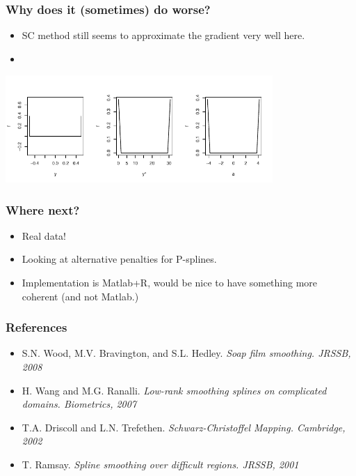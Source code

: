 \documentclass[ignorenonframetext]{beamer} %
\newcommand{\bc}{\begin{center}}
\newcommand{\ec}{\end{center}}
\newcommand{\bi}{\begin{itemize}}
\newcommand{\ei}{\end{itemize}}
\begin{document}
\begin{frame}
	\frametitle{Why does it (sometimes) do worse?}
       \bi
         \item SC method still seems to approximate the gradient very well here.
         \item 
       \ei
       \bc
          \includegraphics[width=4in]{figs/altcentrelinelineplots}\\
       \ec

\end{frame}

\begin{frame}
	\frametitle{Where next?}
       \bi
         \item Real data! 
         \item Looking at alternative penalties for P-splines.
         \item Implementation is Matlab+R, would be nice to have something more coherent (and not Matlab.)
        \ei
\end{frame}


\begin{frame}
	\frametitle{References}
       \bi
         \item S.N. Wood, M.V. Bravington, and S.L. Hedley. \emph{Soap film smoothing. JRSSB, 2008}
         \item H. Wang and M.G. Ranalli. \emph{Low-rank smoothing splines on complicated domains. Biometrics, 2007}
         \item T.A. Driscoll and L.N. Trefethen. \emph{Schwarz-Christoffel Mapping. Cambridge, 2002}
         \item T. Ramsay. \emph{Spline smoothing over difficult regions. JRSSB, 2001}
        \ei
\end{frame}
\end{document}

